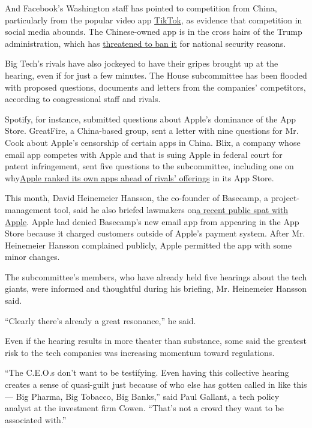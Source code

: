 And Facebook's Washington staff has pointed to competition from China,
particularly from the popular video app
\href{https://www.nytimes3xbfgragh.onion/2020/07/26/technology/tiktok-china-ban-model.html}{TikTok},
as evidence that competition in social media abounds. The Chinese-owned
app is in the cross hairs of the Trump administration, which has
\href{https://www.nytimes3xbfgragh.onion/2020/07/26/technology/tiktok-china-ban-model.html}{threatened
to ban it} for national security reasons.

Big Tech's rivals have also jockeyed to have their gripes brought up at
the hearing, even if for just a few minutes. The House subcommittee has
been flooded with proposed questions, documents and letters from the
companies' competitors, according to congressional staff and rivals.

Spotify, for instance, submitted questions about Apple's dominance of
the App Store. GreatFire, a China-based group, sent a letter with nine
questions for Mr. Cook about Apple's censorship of certain apps in
China. Blix, a company whose email app competes with Apple and that is
suing Apple in federal court for patent infringement, sent five
questions to the subcommittee, including one on
why\href{https://www.nytimes3xbfgragh.onion/interactive/2019/09/09/technology/apple-app-store-competition.html}{Apple
ranked its own apps ahead of rivals' offerings} in its App Store.

This month, David Heinemeier Hansson, the co-founder of Basecamp, a
project-management tool, said he also briefed lawmakers
on\href{https://www.nytimes3xbfgragh.onion/2020/06/19/opinion/apple-app-store-hey.html}{a
recent public spat with Apple}. Apple had denied Basecamp's new email
app from appearing in the App Store because it charged customers outside
of Apple's payment system. After Mr. Heinemeier Hansson complained
publicly, Apple permitted the app with some minor changes.

The subcommittee's members, who have already held five hearings about
the tech giants, were informed and thoughtful during his briefing, Mr.
Heinemeier Hansson said.

``Clearly there's already a great resonance,'' he said.

Even if the hearing results in more theater than substance, some said
the greatest risk to the tech companies was increasing momentum toward
regulations.

``The C.E.O.s don't want to be testifying. Even having this collective
hearing creates a sense of quasi-guilt just because of who else has
gotten called in like this --- Big Pharma, Big Tobacco, Big Banks,''
said Paul Gallant, a tech policy analyst at the investment firm Cowen.
``That's not a crowd they want to be associated with.''

